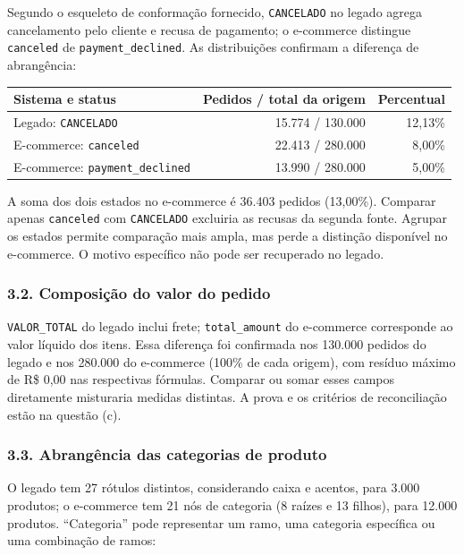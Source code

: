 \documentclass[
]{article}
\begin{document}
Segundo o esqueleto de conformação fornecido, \texttt{CANCELADO} no
legado agrega cancelamento pelo cliente e recusa de pagamento; o
e-commerce distingue \texttt{canceled} de \texttt{payment\_declined}. As
distribuições confirmam a diferença de abrangência:

\begin{longtable}[]{@{}lrr@{}}
\toprule\noalign{}
Sistema e status & Pedidos / total da origem & Percentual \\
\midrule\noalign{}
\endhead
\bottomrule\noalign{}
\endlastfoot
Legado: \texttt{CANCELADO} & 15.774 / 130.000 & 12,13\% \\
E-commerce: \texttt{canceled} & 22.413 / 280.000 & 8,00\% \\
E-commerce: \texttt{payment\_declined} & 13.990 / 280.000 & 5,00\% \\
\end{longtable}

A soma dos dois estados no e-commerce é 36.403 pedidos (13,00\%).
Comparar apenas \texttt{canceled} com \texttt{CANCELADO} excluiria as
recusas da segunda fonte. Agrupar os estados permite comparação mais
ampla, mas perde a distinção disponível no e-commerce. O motivo
específico não pode ser recuperado no legado.

\subsubsection{3.2. Composição do valor do
pedido}\label{composiuxe7uxe3o-do-valor-do-pedido}

\texttt{VALOR\_TOTAL} do legado inclui frete; \texttt{total\_amount} do
e-commerce corresponde ao valor líquido dos itens. Essa diferença foi
confirmada nos 130.000 pedidos do legado e nos 280.000 do e-commerce
(100\% de cada origem), com resíduo máximo de R\$ 0,00 nas respectivas
fórmulas. Comparar ou somar esses campos diretamente misturaria medidas
distintas. A prova e os critérios de reconciliação estão na questão (c).

\subsubsection{3.3. Abrangência das categorias de
produto}\label{abranguxeancia-das-categorias-de-produto}

O legado tem 27 rótulos distintos, considerando caixa e acentos, para
3.000 produtos; o e-commerce tem 21 nós de categoria (8 raízes e 13
filhos), para 12.000 produtos. ``Categoria'' pode representar um ramo,
uma categoria específica ou uma combinação de ramos:
\end{document}

